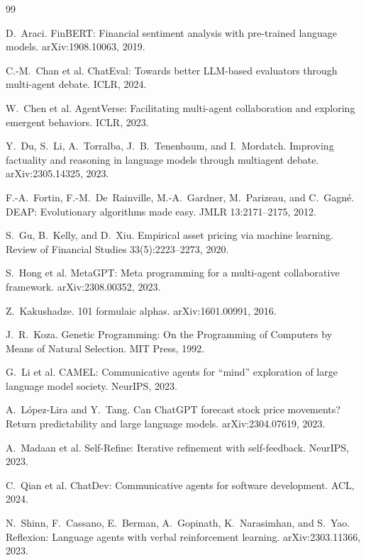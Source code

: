 \documentclass{article}
\theoremstyle{definition}
\theoremstyle{plain}
\theoremstyle{remark}
\begin{document}
\begin{thebibliography}{99}
\small

 D.~Araci. FinBERT: Financial sentiment analysis with pre-trained
language models. arXiv:1908.10063, 2019.

 C.-M.~Chan et al. ChatEval: Towards better LLM-based evaluators
through multi-agent debate. ICLR, 2024.

 W.~Chen et al. AgentVerse: Facilitating multi-agent collaboration
and exploring emergent behaviors. ICLR, 2023.

 Y.~Du, S.~Li, A.~Torralba, J.~B.~Tenenbaum, and I.~Mordatch.
Improving factuality and reasoning in language models through multiagent debate.
arXiv:2305.14325, 2023.

 F.-A.~Fortin, F.-M.~De~Rainville, M.-A.~Gardner, M.~Parizeau, and
C.~Gagn\'e. DEAP: Evolutionary algorithms made easy. JMLR 13:2171--2175, 2012.

 S.~Gu, B.~Kelly, and D.~Xiu. Empirical asset pricing via machine
learning. Review of Financial Studies 33(5):2223--2273, 2020.

 S.~Hong et al. MetaGPT: Meta programming for a multi-agent
collaborative framework. arXiv:2308.00352, 2023.

 Z.~Kakushadze. 101 formulaic alphas. arXiv:1601.00991, 2016.

 J.~R.~Koza. Genetic Programming: On the Programming of Computers by
Means of Natural Selection. MIT Press, 1992.

 G.~Li et al. CAMEL: Communicative agents for ``mind'' exploration of
large language model society. NeurIPS, 2023.

 A.~L\'opez-Lira and Y.~Tang. Can ChatGPT forecast stock price
movements? Return predictability and large language models. arXiv:2304.07619, 2023.

 A.~Madaan et al. Self-Refine: Iterative refinement with
self-feedback. NeurIPS, 2023.

 C.~Qian et al. ChatDev: Communicative agents for software
development. ACL, 2024.

 N.~Shinn, F.~Cassano, E.~Berman, A.~Gopinath, K.~Narasimhan, and
S.~Yao. Reflexion: Language agents with verbal reinforcement learning.
arXiv:2303.11366, 2023.


\end{thebibliography}
\end{document}
